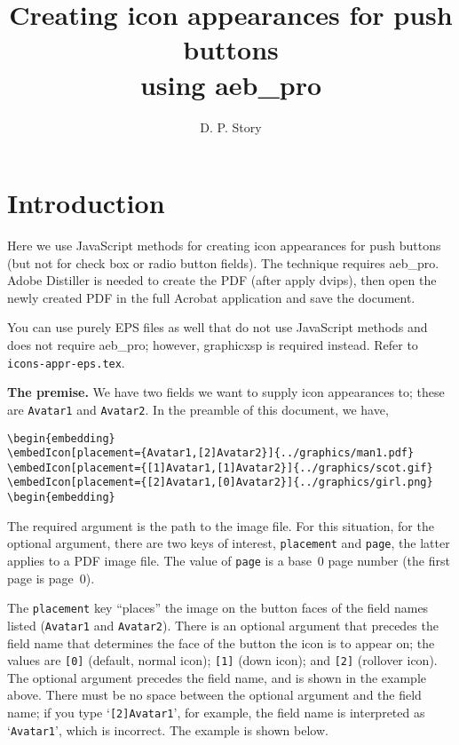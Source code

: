 \documentclass{article}
\title{Creating icon appearances for push buttons\texorpdfstring{\\[1ex]}{}
  using \textsf{aeb\_pro}}
\author{D. P. Story}
\let\pkg\textsf
\let\app\textsf
\def\hardspace{{\fontfamily{cmtt}\selectfont\symbol{32}}}
\begin{document}
\maketitle

\section{Introduction}

Here we use JavaScript methods for creating icon appearances for push buttons
(but not for check box or radio button fields). The technique requires
\app{aeb\_pro}. \app{Adobe Distiller} is needed to create the PDF (after
apply \app{dvips}), then open the newly created PDF in the full \app{Acrobat}
application and save the document.

You can use purely EPS files as well that do not use JavaScript methods and
does not require \pkg{aeb\_pro}; however, \pkg{graphicxsp} is required
instead. Refer to \texttt{icons-appr-eps.tex}.\medskip

\noindent\textbf{The premise.} We have two fields we want to supply icon
appearances to; these are \texttt{Avatar1} and \texttt{Avatar2}. In the
preamble of this document, we have,
\begin{Verbatim}[xleftmargin=\parindent,fontsize=\small]
\begin{embedding}
\embedIcon[placement={Avatar1,[2]Avatar2}]{../graphics/man1.pdf}
\embedIcon[placement={[1]Avatar1,[1]Avatar2}]{../graphics/scot.gif}
\embedIcon[placement={[2]Avatar1,[0]Avatar2}]{../graphics/girl.png}
\begin{embedding}
\end{Verbatim}
The required argument is the path to the image file. For this situation, for
the optional argument, there are two keys of interest, \texttt{placement} and
\texttt{page}, the latter applies to a PDF image file. The value of
\texttt{page} is a base~0 page number (the first page is page~0).

The \texttt{placement} key ``places'' the image on the button faces of the
field names listed (\texttt{Avatar1} and \texttt{Avatar2}). There is an
optional argument that precedes the field name that determines the face of
the button the icon is to appear on; the values are \texttt{[0]} (default,
normal icon); \texttt{[1]} (down icon); and \texttt{[2]} (rollover icon). The
optional argument precedes the field name, and is shown in the example above.
There must be no space between the optional argument and the field name; if
you type `\texttt{[2]\hardspace Avatar1}', for example, the field name is interpreted
as `\texttt{\hardspace Avatar1}', which is incorrect. The example is shown below.\medskip
\end{document}
